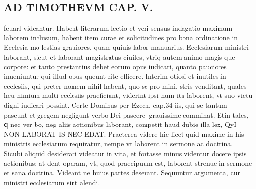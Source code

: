 \documentclass{article}
\begin{document}
\begin{pages}
\section*{AD TIMOTHEVM CAP. V. }
\marginpar{[ p.114 ]}\pstart feuarl videantur. Habent literarum lectio et veri sensus indagatio maximum laborem inclusum, habent item curae et solicitudines pro bona ordinatione in Ecclesia mo lestias grauiores, quam quiuis labor manuarius. Ecclesiarum ministri laborant, sicut et laborant magistratus ciuiles, vtriq autem animo magis que corpore: et tanto prestantius debet eorum opus iudicari, quanto pauciores inueniuntur qui illud opus queunt rite efficere. Interim otiosi et inutiles in ecclesiis, qui preter nomem nihil habent, quo se pro mini. stris venditant, quales heu nimium multi ecclesiis praeficiunt, viderint ipsi num ita laborent, vt suo victu digni iudicari possint. Certe Dominus per Ezech. cap.34-iis, qui se tantum pascunt et gregem negligunt verbo Dei pascere, grauissime comminat. Etin tales, ꝗ nec ver bo, neg aliis actionibus laborant, competit haud dubie illa lex, QyI NON LABORAT IS NEC EDAT. Praeterea videre hic licet quid maxime in his ministris ecclesiarum requiratur, nempe vt laborent in sermone ac doctrina. Sicubi aliquid desiderari videatur in vita, et fortasse minus videntur docere ipsis actionibus: at dent operam, vt, quod praecipuum est, laborent strenue in sermone et sana doctrina. Videant ne huius partes deserant. Sequuntur argumenta, cur ministri ecclesiarum sint alendi.  \pend
{}
{}

\end{pages}
\end{document}
